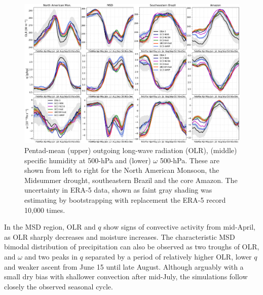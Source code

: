 \begin{figure}[t!]
\centering
 \includegraphics[width=\linewidth]{figures/fig9b.png}
\caption[Seasonal cycle of measures of convection in the AMS]{Pentad-mean (upper) outgoing long-wave radiation (OLR), (middle) specific humidity at 500-hPa and (lower) $\omega$ 500-hPa. These are shown from left to right for the North American Monsoon, the Midsummer drought, southeastern Brazil and the core Amazon. The uncertainty in ERA-5 data, shown as faint gray shading was estimating by bootstrapping with replacement the ERA-5 record 10,000 times. }
\label{fig:9}
\end{figure}

In the MSD region, OLR and $q$ show signs of convective activity from mid-April, as OLR sharply decreases and moisture increases.
The characteristic MSD bimodal distribution of precipitation can also be observed as two troughs of OLR, and $\omega$ and two peaks in $q$ separated by a period of relatively higher OLR, lower $q$ and weaker ascent from June 15 until late August.
Although arguably with a small dry bias with shallower convection after mid-July, the simulations follow closely the observed seasonal cycle.

